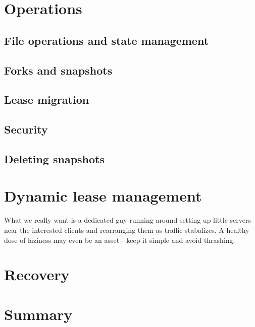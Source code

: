 \section{Operations}
\subsection{File operations and state management}
\subsection{Forks and snapshots}
\subsection{Lease migration}
\subsection{Security}
\subsection{Deleting snapshots}

\section{Dynamic lease management}

What we really want is a dedicated guy running around setting up little servers near the interested clients and rearranging them as traffic stabalizes. A healthy dose of laziness may even be an asset---keep it simple and avoid thrashing.

\section{Recovery}

\section{Summary}